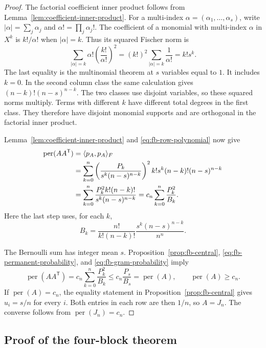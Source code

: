 \documentclass[11pt,a4paper]{article}
\theoremstyle{definition}
\theoremstyle{remark}
\newcommand{\per}{\operatorname{per}}
\newcommand{\T}{\mathsf{T}}
\begin{document}
\begin{proof}
The factorial coefficient inner product follows from
Lemma~\ref{lem:coefficient-inner-product}. For a multi-index
$\alpha=(\alpha_1,\ldots,\alpha_s)$, write
$|\alpha|=\sum_j\alpha_j$ and $\alpha!=\prod_j\alpha_j!$.
The coefficient of a monomial with multi-index $\alpha$ in $X^k$
is $k!/\alpha!$ when $|\alpha|=k$.
Thus its squared Fischer norm is
\begin{equation}\label{eq:fb-factorial-norm}
 \sum_{|\alpha|=k}\alpha!
          \left(\frac{k!}{\alpha!}\right)^2
 =(k!)^2\sum_{|\alpha|=k}\frac1{\alpha!}
 =k!s^k.
\end{equation}
The last equality is the multinomial theorem at $s$ variables equal
to $1$. It includes $k=0$. In the second column class the same
calculation gives $(n-k)!(n-s)^{n-k}$.
The two classes use disjoint variables, so these squared norms
multiply. Terms with different $k$ have different total degrees
in the first class. They therefore have disjoint monomial supports
and are orthogonal in the factorial inner product.

Lemma~\ref{lem:coefficient-inner-product} and
\eqref{eq:fb-row-polynomial} now give
\begin{align}
 \per(AA^\T)
 &=\langle p_A,p_A\rangle_F\notag\\
 &=\sum_{k=0}^n
 \left(\frac{P_k}{s^k(n-s)^{n-k}}\right)^2
       k!s^k(n-k)!(n-s)^{n-k}\notag\\
 &=\sum_{k=0}^n
       \frac{P_k^2k!(n-k)!}{s^k(n-s)^{n-k}}
 =c_n\sum_{k=0}^n\frac{P_k^2}{B_k}.
 \label{eq:fb-gram-probability}
\end{align}
Here the last step uses, for each $k$,
\[
 B_k=\frac{n!}{k!(n-k)!}
           \frac{s^k(n-s)^{n-k}}{n^n}.
\]

The Bernoulli sum has integer mean $s$. Proposition~\ref{prop:fb-central},
\eqref{eq:fb-permanent-probability}, and
\eqref{eq:fb-gram-probability} imply
\[
 \per(AA^\T)
 =c_n\sum_{k=0}^n\frac{P_k^2}{B_k}
 \leq c_n\frac{P_s}{B_s}
 =\per(A),
 \qquad
 \per(A)\geq c_n.
\]
If $\per(A)=c_n$, the equality statement in
Proposition~\ref{prop:fb-central} gives $u_i=s/n$ for every $i$.
Both entries in each row are then $1/n$, so $A=J_n$.
The converse follows from $\per(J_n)=c_n$.
\end{proof}

\subsection{Proof of the four-block theorem}
\end{document}
